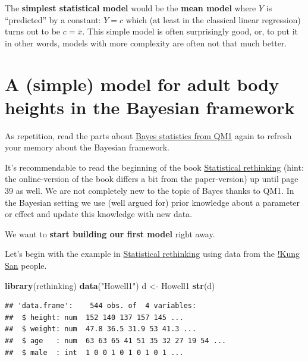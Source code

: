 \documentclass[
]{book}
\newenvironment{Shaded}{\begin{snugshade}}{\end{snugshade}}
\newcommand{\FunctionTok}[1]{\textcolor[rgb]{0.13,0.29,0.53}{\textbf{#1}}}
\newcommand{\NormalTok}[1]{#1}
\newcommand{\OtherTok}[1]{\textcolor[rgb]{0.56,0.35,0.01}{#1}}
\newcommand{\StringTok}[1]{\textcolor[rgb]{0.31,0.60,0.02}{#1}}
\begin{document}
The \textbf{simplest statistical model} would be the \textbf{mean model} where \(Y\) is ``predicted'' by a
constant: \(Y = c\) which (at least in the classical linear regression) turns out to be \(c = \bar{x}\).
This simple model is often surprisingly good, or, to put it in other words, models with more complexity
are often not that much better.

\section{A (simple) model for adult body heights in the Bayesian framework}\label{a-simple-model-for-adult-body-heights-in-the-bayesian-framework}

As repetition, read the parts about \href{https://jdegenfellner.github.io/Script_QM1_ZHAW/bayes_statistics.html}{Bayes statistics from QM1}
again to refresh your memory about the Bayesian framework.

It's recommendable to read the beginning of the book \href{https://civil.colorado.edu/~balajir/CVEN6833/bayes-resources/RM-StatRethink-Bayes.pdf}{Statistical rethinking}
(hint: the online-version of the book differs a bit from the paper-version)
up until page 39 as well. We are not completely new to the topic of Bayes thanks
to QM1. In the Bayesian setting we use (well argued for) prior knowledge about a
parameter or effect and update this knowledge with new data.

We want to \textbf{start building our first model} right away.

Let's begin with the example in
\href{https://civil.colorado.edu/~balajir/CVEN6833/bayes-resources/RM-StatRethink-Bayes.pdf}{Statistical rethinking}
using data from the \href{https://en.wikipedia.org/wiki/\%C7\%83Kung_people}{!Kung San}
people.

\begin{Shaded}
\begin{Highlighting}[]
\FunctionTok{library}\NormalTok{(rethinking)}
\FunctionTok{data}\NormalTok{(}\StringTok{"Howell1"}\NormalTok{)}
\NormalTok{d }\OtherTok{\textless{}{-}}\NormalTok{ Howell1}
\FunctionTok{str}\NormalTok{(d)}
\end{Highlighting}
\end{Shaded}

\begin{verbatim}
## 'data.frame':    544 obs. of  4 variables:
##  $ height: num  152 140 137 157 145 ...
##  $ weight: num  47.8 36.5 31.9 53 41.3 ...
##  $ age   : num  63 63 65 41 51 35 32 27 19 54 ...
##  $ male  : int  1 0 0 1 0 1 0 1 0 1 ...
\end{verbatim}
\end{document}
